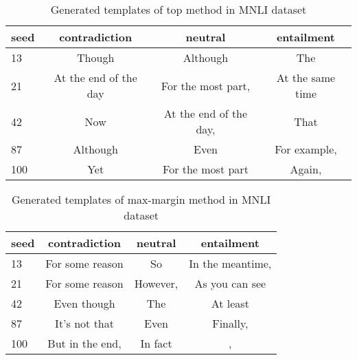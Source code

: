 \begin{table*}[!h]
	\centering
	\small
	\begin{tabular}{l|ccc}
		\toprule
		\textbf{seed} & \textbf{contradiction} & \textbf{neutral} & \textbf{entailment}\\
		\midrule
		13  & Though &   Although & The  \\
		21   & At the end of the day  &  For the most part, &  At the same time \\
		42   & Now & At the end of the day, & That \\
		87   & Although  & Even & For example, \\
		100   & Yet &   For the most part & Again, \\
		\bottomrule
	\end{tabular}
	\caption{Generated templates of top method in MNLI dataset}
	\label{table:template3}
\end{table*}


\begin{table*}[!h]
	\centering
	\small
	\begin{tabular}{l|ccc}
		\toprule
		\textbf{seed} & \textbf{contradiction} & \textbf{neutral} & \textbf{entailment}\\
		\midrule
		13  & For some reason &   So & In the meantime,  \\
		21   & For some reason  & However, &  As you can see\\
		42   & Even though & The & At least \\
		87   & It's not that  & Even & Finally, \\
		100   & But in the end, &  In fact & , \\
		\bottomrule
	\end{tabular}
	\caption{Generated templates of max-margin method in MNLI dataset}
	\label{table:template4}
\end{table*}

